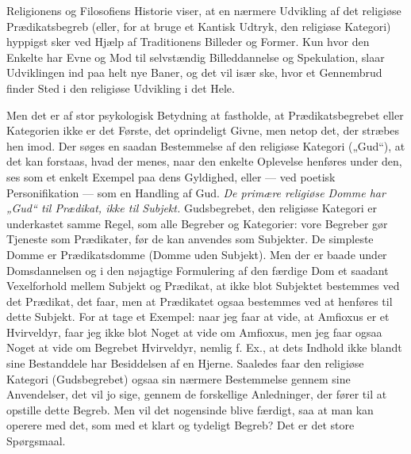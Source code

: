 \documentclass[12pt,a4paper,openany]{book}
\newcommand{\opage}[1]{\marginnote{\footnotesize\textit{[#1]}}}
\begin{document}
Religionens og Filosofiens Historie viser, at en nærmere Udvikling af
det religiøse Prædikatsbegreb (eller, for at bruge et Kantisk Udtryk,
den religiøse Kategori) hyppigst sker ved Hjælp af Traditionens Billeder
og Former. Kun hvor den Enkelte har Evne og Mod til selvstændig
Billeddannelse og Spekulation, slaar Udviklingen ind paa helt nye Baner,
og det vil især ske, hvor et Gennembrud finder Sted i den religiøse
Udvikling i det Hele.

Men det er af stor psykologisk Betydning at fastholde, at
Prædikatsbegrebet eller Kategorien ikke er det Første, det oprindeligt
Givne, men netop det, der stræbes hen imod. Der søges en saadan
Bestemmelse af den religiøse Kategori („Gud“), at det kan forstaas, hvad
der menes, naar den enkelte Oplevelse henføres under den, ses som et
enkelt Exempel paa dens Gyldighed, eller --- ved poetisk Personifikation
--- som en Handling af Gud. \textit{De primære religiøse Domme har „Gud“
til Prædikat, ikke til Subjekt.} Gudsbegrebet, den religiøse Kategori er
underkastet samme Regel, som alle Begreber og Kategorier: vore Begreber
gør Tjeneste som Prædikater, før de kan anvendes som Subjekter. De
simpleste Domme er Prædikatsdomme (Domme uden Subjekt). Men der er baade
under Domsdannelsen og i den nøjagtige Formulering af den færdige Dom et
saadant Vexelforhold mellem Subjekt og Prædikat, at ikke blot Subjektet
bestemmes ved det Prædikat, det faar, men at Prædikatet ogsaa bestemmes
ved at henføres til dette Subjekt. For at tage et Exempel: naar jeg faar
at vide, at Amfioxus er et Hvirveldyr, faar jeg ikke blot Noget at vide
om Amfioxus, men jeg faar ogsaa Noget at vide om Begrebet Hvirveldyr,
nemlig f. Ex., at dets Indhold ikke blandt sine Bestanddele har
Besiddelsen af en Hjerne. Saaledes faar den religiøse Kategori
(Gudsbegrebet) ogsaa sin nærmere Bestemmelse gennem sine Anvendelser,
det vil jo sige, gennem de forskellige Anledninger, der fører til at
opstille dette Begreb.
\opage{125}Men vil det nogensinde blive færdigt, saa at man kan operere
med det, som med et klart og tydeligt Begreb? Det er det store
Spørgsmaal.
\end{document}
